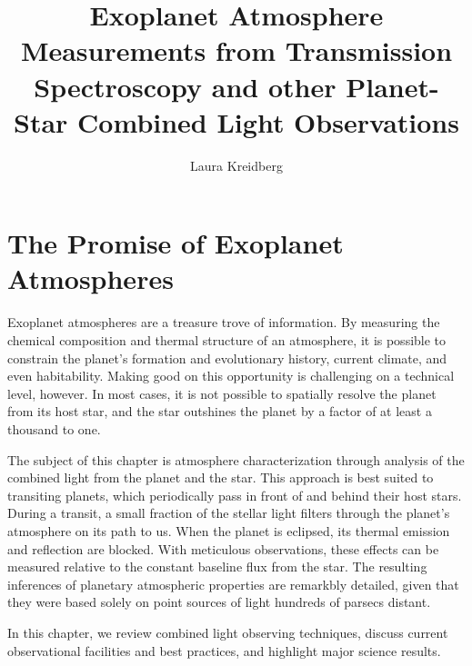 \documentclass[graybox,natbib,nosecnum]{svmult}
\begin{document}
\title*{Exoplanet Atmosphere Measurements from Transmission Spectroscopy and other Planet-Star Combined Light Observations}
\author{Laura Kreidberg}
%
%
\maketitle



\section{The Promise of Exoplanet Atmospheres}
Exoplanet atmospheres are a treasure trove of information. By measuring the chemical composition and thermal structure of an atmosphere, it is possible to constrain the planet's formation and evolutionary history, current climate, and even habitability.  Making good on this opportunity is challenging on a technical level, however. In most cases, it is not possible to spatially resolve the planet from its host star, and the star outshines the planet by a factor of at least a thousand to one. 

The subject of this chapter is atmosphere characterization through analysis of the combined light from the planet and the star. This approach is best suited to transiting planets, which periodically pass in front of and behind their host stars. During a transit, a small fraction of the stellar light filters through the planet's atmosphere on its path to us. When the planet is eclipsed, its thermal emission and reflection are blocked.  With meticulous observations, these effects can be measured relative to the constant baseline flux from the star. The resulting inferences of planetary atmospheric properties are remarkbly detailed, given that they were based solely on point sources of light hundreds of parsecs distant.

In this chapter, we review combined light observing techniques, discuss current observational facilities and best practices, and highlight major science results.
\end{document}
